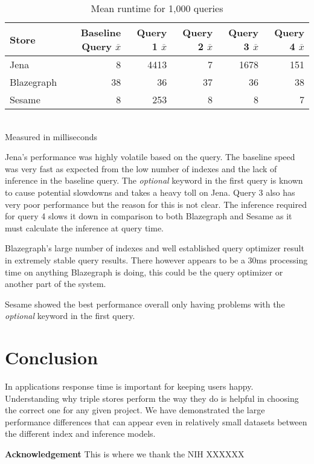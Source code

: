 \documentclass{llncs}
\begin{document}
\begin{table}
\begin{center}
\caption{Mean runtime for 1,000 queries}
\begin{tabular}{l | r r r r r}
    Store & Baseline Query $\overline{x}$ & Query 1 $\overline{x}$ & Query 2 $\overline{x}$ & Query 3 $\overline{x}$ & Query 4 $\overline{x}$ \\
\hline
Jena & 8 & 4413 & 7 & 1678 & 151 \\
Blazegraph & 38 & 36 & 37 & 36 & 38 \\
Sesame & 8 & 253 & 8 & 8 & 7
\end{tabular}
\\[5pt]
Measured in milliseconds
\end{center}
\end{table}

Jena's performance was highly volatile based on the query.  The baseline speed was very fast as expected from the low number of indexes and the lack of inference in the baseline query.  The \emph{optional} keyword in the first query is known to cause potential slowdowns and takes a heavy toll on Jena.  Query 3 also has very poor performance but the reason for this is not clear.  The inference required for query 4 slows it down in comparison to both Blazegraph and Sesame as it must calculate the inference at query time.

Blazegraph's large number of indexes and well established query optimizer result in extremely stable query results.  There however appears to be a 30ms processing time on anything Blazegraph is doing, this could be the query optimizer or another part of the system. 

Sesame showed the best performance overall only having problems with the \emph{optional} keyword in the first query.

\section{Conclusion}
In applications response time is important for keeping users happy.  Understanding why triple stores perform the way they do is helpful in choosing the correct one for any given project.  We have demonstrated the large performance differences that can appear even in relatively small datasets between the different index and inference models.

\medskip
\noindent
\textbf{Acknowledgement} This is where we thank the NIH XXXXXX



\end{document}
